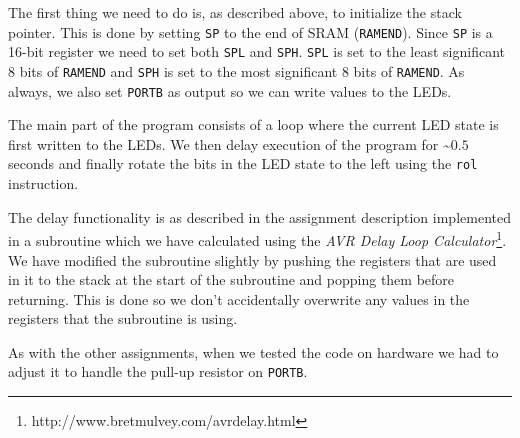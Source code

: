 The first thing we need to do is, as described above, to initialize the stack pointer. This is done by setting \texttt{SP} to the end of SRAM (\texttt{RAMEND}). Since \texttt{SP} is a 16-bit register we need to set both \texttt{SPL} and \texttt{SPH}. \texttt{SPL} is set to the least significant 8 bits of \texttt{RAMEND} and \texttt{SPH} is set to the most significant 8 bits of \texttt{RAMEND}. As always, we also set \texttt{PORTB} as output so we can write values to the LEDs.

The main part of the program consists of a loop where the current LED state is first written to the LEDs. We then delay execution of the program for \textasciitilde $0.5$ seconds and finally rotate the bits in the LED state to the left using the \texttt{rol} instruction. 

The delay functionality is as described in the assignment description implemented in a subroutine which we have calculated using the \emph{AVR Delay Loop Calculator}\footnote{http://www.bretmulvey.com/avrdelay.html}. We have modified the subroutine slightly by pushing the registers that are used in it to the stack at the start of the subroutine and popping them before returning. This is done so we don't accidentally overwrite any values in the registers that the subroutine is using.

As with the other assignments, when we tested the code on hardware we had to adjust it to handle the pull-up resistor on \texttt{PORTB}.
